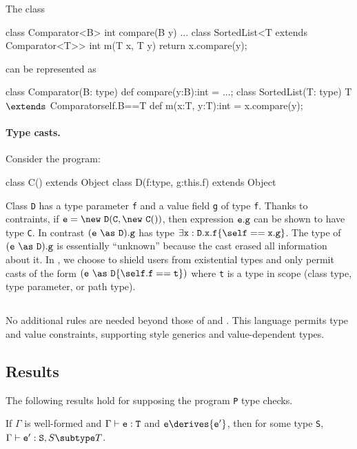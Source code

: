 \begin{example}
\noindent The \FGJ{} class 
\begin{xten} 
class Comparator<B> {
  int compare(B y) { ... } }
class SortedList<T extends Comparator<T>> { 
  int m(T x, T y) {
     return x.compare(y); } }
\end{xten}
\noindent can be represented as
\begin{xtenmath} 
class Comparator(B: type) {
  def compare(y:B):int = ...; }
class SortedList(T: type)
    {T $\extends$ Comparator{self.B==T}} { 
  def m(x:T, y:T):int = x.compare(y); }
\end{xtenmath}
\end{example}

\paragraph{Type casts.} 
Consider the program:
\begin{xten}
class C() extends Object {}
class D(f:type, g:this.f) extends Object {}
\end{xten}
Class {\tt D} has a type parameter {\tt f} and a value field {\tt g} of type {\tt f}.
Thanks to contraints, if
${\tt e}=\new~{\tt D}({\tt C},\new~{\tt C}())$,
then expression ${\tt e}.{\tt g}$ can be shown to
have type {\tt C}.
In contrast $({\tt e}~\as~{\tt D}).{\tt g}$ has type
$\exists {\tt x}:{\tt D}.{\tt x}.{\tt f}\{\self=={\tt x.g}\}$.
The type of $({\tt e}~\as~{\tt D}).{\tt g}$ is essentially ``unknown''
because the cast erased all information about it. In \Xten, we choose to shield users from existential types and only permit casts of the form $({\tt e}~\as~{\tt D}\{\self.{\tt f}=={\tt t}\})$ where {\tt t} is a type in scope (class type, type parameter, or path type).


\subsection{\FXGD} 

No additional rules are needed beyond those of \FXG{} and \FXD{}. This
language permits type and value constraints, supporting \FGJ{} style
generics and value-dependent types.

\subsection{Results}
The following results hold for \FXGD supposing the program {\tt P} type checks.

\begin{theorem} If $\Gamma$ is well-formed and $\Gamma \vdash {\tt e:T}$ and ${\tt e} \derives {\tt e'}$, then
for some type {\tt S}, $\Gamma \vdash {\tt e':S},{S \subtype T}$.
\end{theorem}


